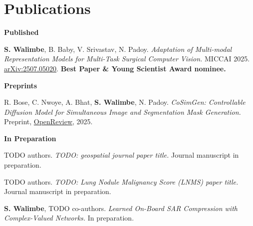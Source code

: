 \documentclass[letterpaper,11pt]{article}
\newcounter{pubcount}
\begin{document}
\section{Publications}
\textbf{Published} \vspace{-0.4em}
\begin{enumerate}[label={[\arabic*]}, leftmargin=*, itemsep=0.2em]
    \item \textbf{S. Walimbe}, B. Baby, V. Srivastav, N. Padoy. \textit{Adaptation of Multi-modal Representation Models for Multi-Task Surgical Computer Vision.} MICCAI 2025. \href{https://arxiv.org/abs/2507.05020}{arXiv:2507.05020}. \textbf{Best Paper \& Young Scientist Award nominee.}
\setcounter{pubcount}{\value{enumi}}
\end{enumerate}
\textbf{Preprints} \vspace{-0.4em}
\begin{enumerate}[label={[\arabic*]}, leftmargin=*, itemsep=0.2em]
\setcounter{enumi}{\value{pubcount}}
    \item R. Bose, C. Nwoye, A. Bhat, \textbf{S. Walimbe}, N. Padoy. \textit{CoSimGen: Controllable Diffusion Model for Simultaneous Image and Segmentation Mask Generation.} Preprint, \href{https://openreview.net/forum?id=z8rQHF8OOt}{OpenReview}, 2025. %
\setcounter{pubcount}{\value{enumi}}
\end{enumerate}
\textbf{In Preparation} \vspace{-0.4em}
\begin{enumerate}[label={[\arabic*]}, leftmargin=*, itemsep=0.2em]
\setcounter{enumi}{\value{pubcount}}
    \item TODO authors. \textit{TODO: geospatial journal paper title.} Journal manuscript in preparation. %
    \item TODO authors. \textit{TODO: Lung Nodule Malignancy Score (LNMS) paper title.} Journal manuscript in preparation. %
    \item \textbf{S. Walimbe}, TODO co-authors. \textit{Learned On-Board SAR Compression with Complex-Valued Networks.} In preparation. %
\end{enumerate}
\end{document}
